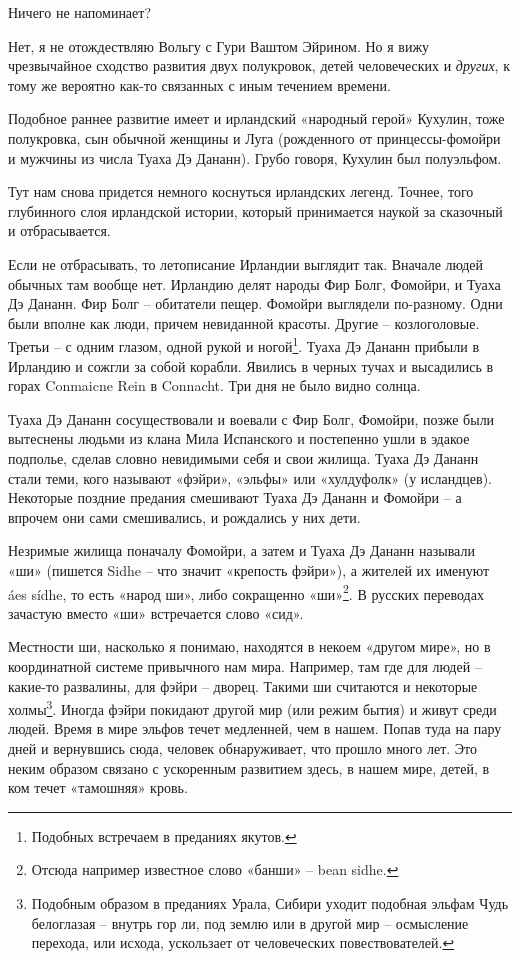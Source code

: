 Ничего не напоминает?

Нет, я не отождествляю Вольгу с Гури Ваштом Эйрином. Но я вижу чрезвычайное сходство развития двух полукровок, детей человеческих и \textit{других}, к тому же вероятно как-то связанных с иным течением времени.

Подобное раннее развитие имеет и ирландский «народный герой» Кухулин, тоже полукровка, сын обычной женщины и Луга (рожденного от принцессы-фомойри и мужчины из числа Туаха Дэ Дананн). Грубо говоря, Кухулин был полуэльфом.

Тут нам снова придется немного коснуться ирландских легенд. Точнее, того глубинного слоя ирландской истории, который принимается наукой за сказочный и отбрасывается. 

Если не отбрасывать, то летописание Ирландии выглядит так. Вначале людей обычных там вообще нет. Ирландию делят народы Фир Болг, Фомойри, и Туаха Дэ Дананн. Фир Болг – обитатели пещер. Фомойри выглядели по-разному. Одни были вполне как люди, причем невиданной красоты. Другие – козлоголовые. Третьи – с одним глазом, одной рукой и ногой\footnote{Подобных встречаем в преданиях якутов.}. Туаха Дэ Дананн прибыли в Ирландию и сожгли за собой корабли. Явились в черных тучах и высадились в горах Conmaicne Rein в Connacht. Три дня не было видно солнца.

Туаха Дэ Дананн сосуществовали и воевали с Фир Болг, Фомойри, позже были вытеснены людьми из клана Мила Испанского и постепенно ушли в эдакое подполье, сделав словно невидимыми себя и свои жилища. Туаха Дэ Дананн стали теми, кого называют «фэйри», «эльфы» или «хулдуфолк» (у исландцев). Некоторые поздние предания смешивают Туаха Дэ Дананн и Фомойри – а впрочем они сами смешивались, и рождались у них дети.

Незримые жилища поначалу Фомойри, а затем и Туаха Дэ Дананн называли «ши» (пишется Sidhe – что значит «крепость фэйри»), а жителей их именуют áes sídhe, то есть «народ ши», либо сокращенно «ши»\footnote{Отсюда например известное слово «банши» – bean sidhe.}. В русских переводах зачастую вместо «ши» встречается слово «сид».

Местности ши, насколько я понимаю, находятся в некоем «другом мире», но в координатной системе привычного нам мира. Например, там где для людей – какие-то развалины, для фэйри – дворец. Такими ши считаются и некоторые холмы\footnote{Подобным образом в преданиях Урала, Сибири уходит подобная эльфам Чудь белоглазая – внутрь гор ли, под землю или в другой мир – осмысление перехода, или исхода, ускользает от человеческих повествователей.}. Иногда фэйри покидают другой мир (или режим бытия) и живут среди людей. Время в мире эльфов течет медленней, чем в нашем. Попав туда на пару дней и вернувшись сюда, человек обнаруживает, что прошло много лет. Это неким образом связано с ускоренным развитием здесь, в нашем мире, детей, в ком течет «тамошняя» кровь.

